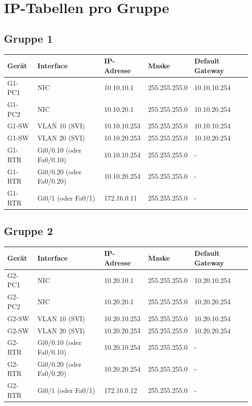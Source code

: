 \documentclass[11pt, oneside, numbers=noenddot]{scrbook}
\begin{document}
\chapter{IP-Tabellen pro Gruppe}
\section{Gruppe 1}
\begin{longtable}{|l|l|l|l|l|}
\hline
Gerät & Interface & IP-Adresse & Maske & Default Gateway \\
\hline
G1-PC1 & NIC & 10.10.10.1 & 255.255.255.0 & 10.10.10.254 \\
\hline
G1-PC2 & NIC & 10.10.20.1 & 255.255.255.0 & 10.10.20.254 \\
\hline
G1-SW & VLAN 10 (SVI) & 10.10.10.253 & 255.255.255.0 & 10.10.10.254 \\
\hline
G1-SW & VLAN 20 (SVI) & 10.10.20.253 & 255.255.255.0 & 10.10.20.254 \\
\hline
G1-RTR & Gi0/0.10 (oder Fa0/0.10) & 10.10.10.254 & 255.255.255.0 & - \\
\hline
G1-RTR & Gi0/0.20 (oder Fa0/0.20) & 10.10.20.254 & 255.255.255.0 & - \\
\hline
G1-RTR & Gi0/1 (oder Fa0/1) & 172.16.0.11 & 255.255.255.0 & - \\
\hline
\end{longtable}

\section{Gruppe 2}
\begin{longtable}{|l|l|l|l|l|}
\hline
Gerät & Interface & IP-Adresse & Maske & Default Gateway \\
\hline
G2-PC1 & NIC & 10.20.10.1 & 255.255.255.0 & 10.20.10.254 \\
\hline
G2-PC2 & NIC & 10.20.20.1 & 255.255.255.0 & 10.20.20.254 \\
\hline
G2-SW & VLAN 10 (SVI) & 10.20.10.253 & 255.255.255.0 & 10.20.10.254 \\
\hline
G2-SW & VLAN 20 (SVI) & 10.20.20.253 & 255.255.255.0 & 10.20.20.254 \\
\hline
G2-RTR & Gi0/0.10 (oder Fa0/0.10) & 10.20.10.254 & 255.255.255.0 & - \\
\hline
G2-RTR & Gi0/0.20 (oder Fa0/0.20) & 10.20.20.254 & 255.255.255.0 & - \\
\hline
G2-RTR & Gi0/1 (oder Fa0/1) & 172.16.0.12 & 255.255.255.0 & - \\
\hline
\end{longtable}
\newpage
\end{document}
